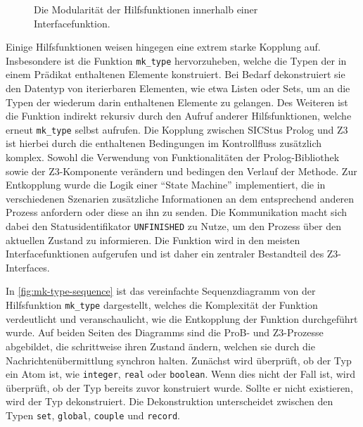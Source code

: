 \begin{figure}[!htp]
\begin{tikzpicture}[scale=1, every node/.style={scale=1}]

    \end{tikzpicture}
    \caption{Die Modularität der Hilfsfunktionen innerhalb einer Interfacefunktion.}
    \label{fig:help_modular}
\end{figure}

Einige Hilfsfunktionen weisen hingegen eine extrem starke Kopplung auf.
Insbesondere ist die Funktion \texttt{mk\_type} hervorzuheben, welche die Typen der in einem Prädikat enthaltenen Elemente konstruiert.
Bei Bedarf dekonstruiert sie den Datentyp von iterierbaren Elementen, wie etwa Listen oder Sets, um an die Typen der wiederum darin enthaltenen Elemente zu gelangen.
Des Weiteren ist die Funktion indirekt rekursiv durch den Aufruf anderer Hilfsfunktionen, welche erneut \texttt{mk\_type} selbst aufrufen.
Die Kopplung zwischen SICStus Prolog und Z3 ist hierbei durch die enthaltenen Bedingungen im Kontrollfluss zusätzlich komplex.
Sowohl die Verwendung von Funktionalitäten der Prolog-Bibliothek sowie der Z3-Komponente verändern und bedingen den Verlauf der Methode.
Zur Entkopplung wurde die Logik einer \enquote{State Machine} implementiert, die in verschiedenen Szenarien zusätzliche Informationen
an dem entsprechend anderen Prozess anfordern oder diese an ihn zu senden.
Die Kommunikation macht sich dabei den Statusidentifikator \texttt{UNFINISHED} zu Nutze, um den Prozess über den aktuellen Zustand zu informieren.
Die Funktion wird in den meisten Interfacefunktionen aufgerufen und ist daher ein zentraler Bestandteil des Z3-Interfaces.

In \cref{fig:mk-type-sequence} ist das vereinfachte Sequenzdiagramm von der Hilfsfunktion \texttt{mk\_type} dargestellt, welches die Komplexität der Funktion verdeutlicht
und veranschaulicht, wie die Entkopplung der Funktion durchgeführt wurde.
Auf beiden Seiten des Diagramms sind die ProB- und Z3-Prozesse abgebildet, die schrittweise ihren Zustand ändern, welchen sie durch die Nachrichtenübermittlung synchron halten.
Zunächst wird überprüft, ob der Typ ein Atom ist, wie \texttt{integer}, \texttt{real} oder \texttt{boolean}.
Wenn dies nicht der Fall ist, wird überprüft, ob der Typ bereits zuvor konstruiert wurde.
Sollte er nicht existieren, wird der Typ dekonstruiert. Die Dekonstruktion unterscheidet zwischen den Typen \texttt{set}, \texttt{global}, \texttt{couple} und \texttt{record}.

